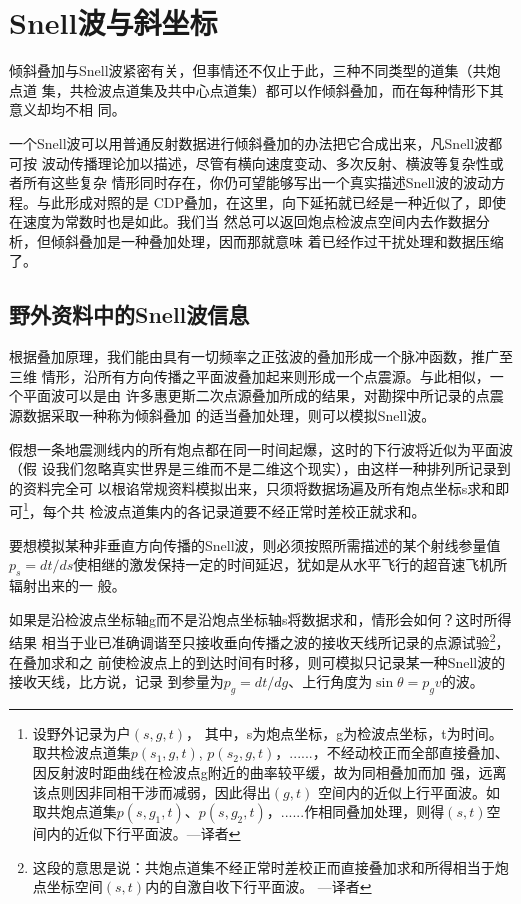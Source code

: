 \section{Snell波与斜坐标}
\label{sec:5.3}

倾斜叠加与Snell波紧密有关，但事情还不仅止于此，三种不同类型的道集（共炮点道
集，共检波点道集及共中心点道集）都可以作倾斜叠加，而在每种情形下其意义却均不相
同。

一个Snell波可以用普通反射数据进行倾斜叠加的办法把它合成出来，凡Snell波都可按
波动传播理论加以描述，尽管有横向速度变动、多次反射、横波等复杂性或者所有这些复杂
情形同时存在，你仍可望能够写出一个真实描述Snell波的波动方程。与此形成对照的是
CDP叠加，在这里，向下延拓就已经是一种近似了，即使在速度为常数时也是如此。我们当
然总可以返回炮点检波点空间内去作数据分析，但倾斜叠加是一种叠加处理，因而那就意味
着已经作过干扰处理和数据压缩了。

\subsection{野外资料中的Snell波信息}
\label{sec:5.3.1}

根据叠加原理，我们能由具有一切频率之正弦波的叠加形成一个脉冲函数，推广至三维
情形，沿所有方向传播之平面波叠加起来则形成一个点震源。与此相似，一个平面波可以是由
许多惠更斯二次点源叠加所成的结果，对勘探中所记录的点震源数据采取一种称为倾斜叠加
的适当叠加处理，则可以模拟Snell波。

假想一条地震测线内的所有炮点都在同一时间起爆，这时的下行波将近似为平面波（假
设我们忽略真实世界是三维而不是二维这个现实），由这样一种排列所记录到的资料完全可
以根谄常规资料模拟出来，只须将数据场遍及所有炮点坐标s求和即可\footnote{
设野外记录为户$(s, g,t)$，
其中，s为炮点坐标，g为检波点坐标，t为时间。取共检波点道集$p(s_1, g,
t)$, $p(s_2,g,t)$，......，不经动校正而全部直接叠加、因反射波时距曲线在检波点g附近的曲率较平缓，故为同相叠加而加
强，远离该点则因非同相干涉而减弱，因此得出$(g,t)$
空间内的近似上行平面波。如取共炮点道集$p(s, g_1, t)$、$p(s,
g_2,t)$，......作相同叠加处理，则得$(s,t)$空间内的近似下行平面波。---译者
}，每个共
检波点道集内的各记录道要不经正常时差校正就求和。

要想模拟某种非垂直方向传播的Snell波，则必须按照所需描述的某个射线参量值$p_s=
dt/ds$使相继的激发保持一定的时间延迟，犹如是从水平飞行的超音速飞机所辐射出来的一
般。

如果是沿检波点坐标轴g而不是沿炮点坐标轴s将数据求和，情形会如何？这时所得结果
相当于业已准确调谐至只接收垂向传播之波的接收天线所记录的点源试验\footnote{
这段的意思是说：共炮点道集不经正常时差校正而直接叠加求和所得相当于炮点坐标空间$(s,t)$内的自激自收下行平面波。 ---译者
}，在叠加求和之
前使检波点上的到达时间有时移，则可模拟只记录某一种Snell波的接收天线，比方说，记录
到参量为$p_g=dt/dg$、上行角度为$\sin\theta=p_gv$的波。

